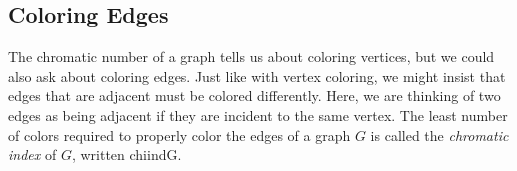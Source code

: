 \documentclass[12pt]{article}
\begin{document}
%
%
%
%
%
%



\subsection{Coloring Edges}


The chromatic number of a graph tells us about coloring vertices, but we could also ask about coloring edges.  Just like with vertex coloring, we might insist that edges that are adjacent must be colored differently.  Here, we are thinking of two edges as being adjacent if they are incident to the same vertex.  The least number of colors required to properly color the edges of a graph $G$ is called the \emph{chromatic index} of $G$, written \gls{chiindG}.
\end{document}
